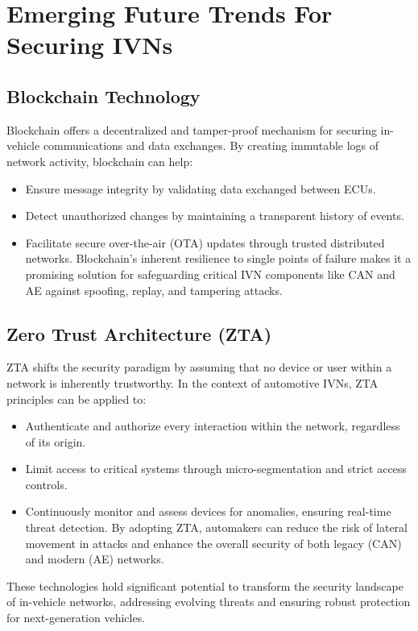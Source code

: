 \documentclass{report}
\begin{document}
\section{Emerging Future Trends For Securing IVNs}

\subsection{Blockchain Technology}
Blockchain offers a decentralized and tamper-proof mechanism for securing in-vehicle communications and data exchanges. By creating immutable logs of network activity, blockchain can help:
\begin{itemize}
    \item Ensure message integrity by validating data exchanged between ECUs.
    \item Detect unauthorized changes by maintaining a transparent history of events.
    \item Facilitate secure over-the-air (OTA) updates through trusted distributed networks. Blockchain's inherent resilience to single points of failure makes it a promising solution for safeguarding critical IVN components like CAN and AE against spoofing, replay, and tampering attacks.

\end{itemize}

\subsection{Zero Trust Architecture (ZTA)}
ZTA shifts the security paradigm by assuming that no device or user within a network is inherently trustworthy. In the context of automotive IVNs, ZTA principles can be applied to:
\begin{itemize}
    \item Authenticate and authorize every interaction within the network, regardless of its origin.
    \item Limit access to critical systems through micro-segmentation and strict access controls.
    \item Continuously monitor and assess devices for anomalies, ensuring real-time threat detection. By adopting ZTA, automakers can reduce the risk of lateral movement in attacks and enhance the overall security of both legacy (CAN) and modern (AE) networks.

\end{itemize}

These  technologies hold significant potential to transform the security landscape of in-vehicle networks, addressing evolving threats and ensuring robust protection for next-generation vehicles.
\end{document}
